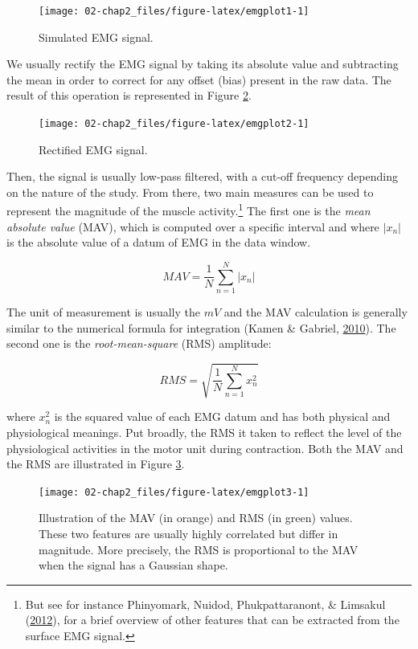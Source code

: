 \documentclass[a4paper,12pt,twoside,onecolumn,openright,final,oldfontcommands]{memoir}
\let\rmarkdownfootnote\footnote%
\def\footnote{\protect\rmarkdownfootnote}
\begin{document}
\begin{figure}[ht]

{\centering \texttt{[image: 02-chap2\_files/figure-latex/emgplot1-1]} 

}

\caption{Simulated EMG signal.}\label{fig:emgplot1}
\end{figure}

We usually rectify the EMG signal by taking its absolute value and subtracting the mean in order to correct for any offset (bias) present in the raw data. The result of this operation is represented in Figure \ref{fig:emgplot2}.

\begin{figure}[ht]

{\centering \texttt{[image: 02-chap2\_files/figure-latex/emgplot2-1]} 

}

\caption{Rectified EMG signal.}\label{fig:emgplot2}
\end{figure}

Then, the signal is usually low-pass filtered, with a cut-off frequency depending on the nature of the study. From there, two main measures can be used to represent the magnitude of the muscle activity.\footnote{But see for instance Phinyomark, Nuidod, Phukpattaranont, \& Limsakul (\protect\hyperlink{ref-phinyomark_feature_2012}{2012}), for a brief overview of other features that can be extracted from the surface EMG signal.} The first one is the \emph{mean absolute value} (MAV), which is computed over a specific interval and where \(|x_{n}|\) is the absolute value of a datum of EMG in the data window.

\[MAV = \frac{1}{N} \sum_{n=1}^{N} | x_{n} |\]

The unit of measurement is usually the \(mV\) and the MAV calculation is generally similar to the numerical formula for integration (Kamen \& Gabriel, \protect\hyperlink{ref-kamen_essentials_2010}{2010}). The second one is the \emph{root-mean-square} (RMS) amplitude:

\[RMS = \sqrt{ \frac{1}{N} \sum_{n=1}^{N} x^{2}_{n} }\]

where \(x^{2}_{n}\) is the squared value of each EMG datum and has both physical and physiological meanings. Put broadly, the RMS it taken to reflect the level of the physiological activities in the motor unit during contraction. Both the MAV and the RMS are illustrated in Figure \ref{fig:emgplot3}.

\begin{figure}[ht]

{\centering \texttt{[image: 02-chap2\_files/figure-latex/emgplot3-1]} 

}

\caption{Illustration of the MAV (in orange) and RMS (in green) values. These two features are usually highly correlated but differ in magnitude. More precisely, the RMS is proportional to the MAV when the signal has a Gaussian shape.}\label{fig:emgplot3}
\end{figure}
\end{document}
